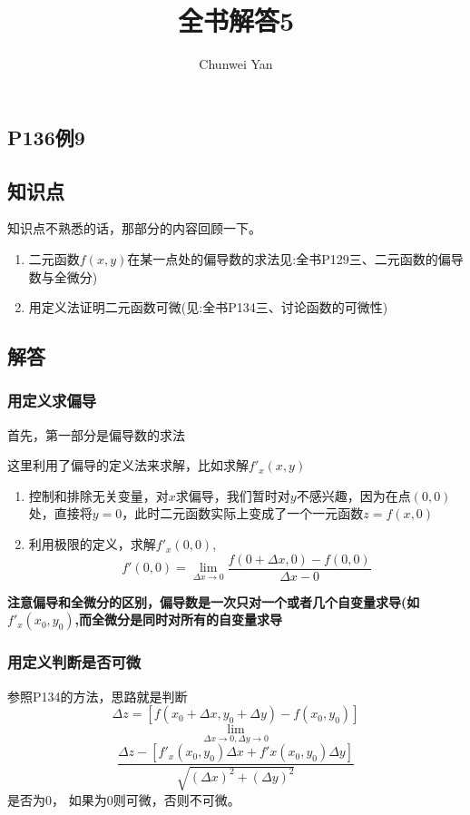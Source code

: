 \documentclass[a4paper]{ctexart}
\author{Chunwei Yan}
\title{全书解答5}
\begin{document}
    \maketitle
\begin{multicols}{2}

\section{P136例9}
\subsection{知识点}
知识点不熟悉的话，那部分的内容回顾一下。
\begin{enumerate}
    \item 二元函数$f(x,y)$在某一点处的偏导数的求法见:全书P129\quad 三、二元函数的偏导数与全微分)
    \item 用定义法证明二元函数可微(见:全书P134\quad 三、讨论函数的可微性)
\end{enumerate}

\subsection{解答}
\subsubsection{用定义求偏导}
\par
首先，第一部分是偏导数的求法
\par 这里利用了偏导的定义法来求解，比如求解$f'_x(x,y)$
\begin{enumerate}
    \item 控制和排除无关变量，对$x$求偏导，我们暂时对$y$不感兴趣，因为在点$(0,0)$处，直接将$y=0$，此时二元函数实际上变成了一个一元函数$z=f(x,0)$
    \item 利用极限的定义，求解$f'_x(0,0)$,
    $$
        f'(0,0) =\lim_{\Delta x\rightarrow 0}{ \frac{f(0+\Delta x, 0) - f(0,0)}
                        {\Delta x - 0}}
    $$
\end{enumerate}
\par
\textbf{注意偏导和全微分的区别，偏导数是一次只对一个或者几个自变量求导(如$f'_x(x_0, y_0)$,而全微分是同时对所有的自变量求导}

\subsubsection{用定义判断是否可微}
参照P134的方法，思路就是判断
$$
\Delta z = [f(x_0+\Delta x, y_0 + \Delta y) - f(x_0, y_0)]
$$
$$
\lim_{\Delta x\rightarrow 0, \Delta y\rightarrow 0}
$$
$$
\frac{
        \Delta z 
        -
        [f'_x(x_0, y_0)\Delta x + f'x(x_0, y_0)\Delta y]
    }
    {\sqrt{(\Delta x)^2 + (\Delta y)^2}}
$$
是否为0， 如果为0则可微，否则不可微。


\end{multicols}
\end{document}
